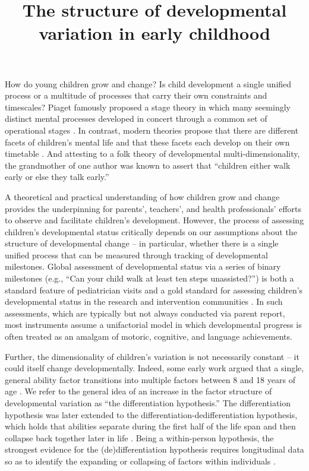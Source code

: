 \documentclass[man, floatsintext]{apa7}
\title{The structure of developmental variation in early childhood}
\author{\vspace{1em}}
\affiliation{\vspace{1em}}
\begin{document}
\maketitle

How do young children grow and change? Is child development a single
uniﬁed process or a multitude of processes that carry their own
constraints and timescales? Piaget famously proposed a stage theory in
which many seemingly distinct mental processes developed in concert
through a common set of operational stages \parencite{flavell1963}. In contrast, modern
theories propose that there are different facets of children's mental
life and that these facets each develop on their own timetable \parencite{gelman1983}. And attesting to a folk theory of developmental multi-dimensionality, the
grandmother of one author was known to assert that
``children either walk early or else they talk early.''

A theoretical and practical understanding of how children grow and change
provides the underpinning for parents', teachers', and health professionals'
efforts to observe and facilitate children's development. However, the process of assessing
children's developmental status critically depends on our assumptions
about the structure of developmental change -- in particular, whether
there is a single uniﬁed process that can be measured through tracking
of developmental milestones. Global assessment of developmental status
via a series of binary milestones (e.g., ``Can your child walk at least
ten steps unassisted?'') is both a standard feature of pediatrician
visits and a gold standard for assessing children's developmental
status in the research and intervention communities \parencite{sheldrick2019,bayley2009,bricker1999,mccoy2019,weber2019}. In such
assessments, which are typically but not always conducted via parent
report, most
instruments assume a unifactorial model \parencite[although some also
provide subscale scores;][]{bayley2009} in which developmental progress is often treated as an
amalgam of motoric, cognitive, and language achievements.

Further, the dimensionality of children's variation is not necessarily constant -- it could itself change developmentally.
Indeed, some early work argued that a single, general
ability factor transitions into multiple factors between 8 and 18 years of age
\parencite{garrett1946}. We refer to the general idea of an increase in the factor structure of developmental variation as ``the differentiation hypothesis.'' The differentiation hypothesis was later extended to the
differentiation-dedifferentiation hypothesis, which holds that abilities
separate during the first half of the life span and then collapse back
together later in life \parencite{lienert1964,tucker-drob2009,breit2020}. Being a within-person hypothesis, the
strongest evidence for the (de)differentiation hypothesis requires
longitudinal data so as to identify the expanding or collapsing of
factors within individuals \parencite{hulur2015}.
\end{document}
